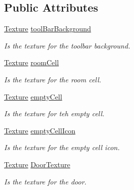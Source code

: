 \subsection*{Public Attributes}
\begin{DoxyCompactItemize}
\item 
\mbox{\label{class_tool_bar_afb2a8ae55fe6b6f59ba33c414d2d507d}} 
\hyperlink{class_texture}{Texture} \hyperlink{class_tool_bar_afb2a8ae55fe6b6f59ba33c414d2d507d}{tool\+Bar\+Background}
\begin{DoxyCompactList}\small\item\em Is the texture for the toolbar background. \end{DoxyCompactList}\item 
\mbox{\label{class_tool_bar_a1941719914acb71c6d47638cb69a3ebe}} 
\hyperlink{class_texture}{Texture} \hyperlink{class_tool_bar_a1941719914acb71c6d47638cb69a3ebe}{room\+Cell}
\begin{DoxyCompactList}\small\item\em Is the texture for the room cell. \end{DoxyCompactList}\item 
\mbox{\label{class_tool_bar_a381c33f1861fdcddfc0f266ae1bcc22b}} 
\hyperlink{class_texture}{Texture} \hyperlink{class_tool_bar_a381c33f1861fdcddfc0f266ae1bcc22b}{empty\+Cell}
\begin{DoxyCompactList}\small\item\em Is the texture for teh empty cell. \end{DoxyCompactList}\item 
\mbox{\label{class_tool_bar_ace6dfeb246713c08e8ea2705a3f597be}} 
\hyperlink{class_texture}{Texture} \hyperlink{class_tool_bar_ace6dfeb246713c08e8ea2705a3f597be}{empty\+Cell\+Icon}
\begin{DoxyCompactList}\small\item\em Is the texture for the empty cell icon. \end{DoxyCompactList}\item 
\mbox{\label{class_tool_bar_a98b31dbb137739c3213075ab2076e718}} 
\hyperlink{class_texture}{Texture} \hyperlink{class_tool_bar_a98b31dbb137739c3213075ab2076e718}{Door\+Texture}
\begin{DoxyCompactList}\small\item\em Is the texture for the door. \end{DoxyCompactList}\item 

\end{DoxyCompactItemize}
